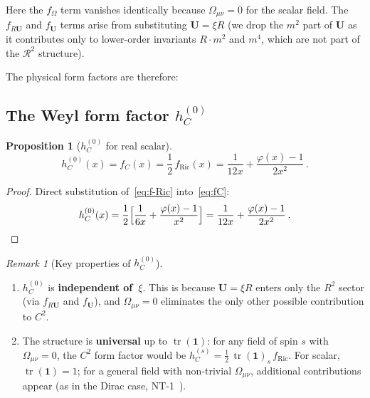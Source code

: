 \documentclass[11pt,a4paper]{article}
\newcommand{\Id}{\mathbf{1}}
\newcommand{\tr}{\operatorname{tr}}
\newtheorem{proposition}[theorem]{Proposition}
\theoremstyle{definition}
\theoremstyle{remark}
\newtheorem{remark}[theorem]{Remark}
\begin{document}
Here the $f_\Omega$ term vanishes identically
because $\Omega_{\mu\nu} = 0$ for the scalar field.
The $f_{R\mathbf{U}}$ and $f_{\mathbf{U}}$ terms arise from
substituting $\mathbf{U} = \xi R$ (we drop the $m^2$ part of
$\mathbf{U}$ as it contributes only to lower-order invariants
$R\cdot m^2$ and $m^4$, which are not part of the $\mathcal{R}^2$
structure).

The physical form factors are therefore:


\subsection{The Weyl form factor $h_C^{(0)}$}

\begin{proposition}[$h_C^{(0)}$ for real scalar]
\label{prop:hC}
\begin{equation}
  \boxed{
  h_C^{(0)}(x) = f_C(x) = \frac{1}{2}\,f_{\text{Ric}}(x)
  = \frac{1}{12x} + \frac{\varphi(x) - 1}{2x^2}\,.
  }
  \label{eq:hC}
\end{equation}
\end{proposition}

\begin{proof}
Direct substitution of~\eqref{eq:f-Ric} into~\eqref{eq:fC}:
\begin{equation*}
  h_C^{(0)}(x)
  = \frac{1}{2}\Bigl[\frac{1}{6x} + \frac{\varphi(x)-1}{x^2}\Bigr]
  = \frac{1}{12x} + \frac{\varphi(x)-1}{2x^2}\,.
\end{equation*}
\end{proof}

\begin{remark}[Key properties of $h_C^{(0)}$]
\label{rem:hC-properties}
\begin{enumerate}[nosep]
\item $h_C^{(0)}$ is \textbf{independent of~$\xi$}.  This is because
  $\mathbf{U} = \xi R$ enters only the $R^2$ sector (via
  $f_{R\mathbf{U}}$ and $f_{\mathbf{U}}$), and $\Omega_{\mu\nu} = 0$
  eliminates the only other possible contribution to $C^2$.
\item The structure is \textbf{universal} up to $\tr(\Id)$:
  for any field of spin $s$ with $\Omega_{\mu\nu} = 0$,
  the $C^2$ form factor would be
  $h_C^{(s)} = \frac{1}{2}\,\tr(\Id)_s\,f_{\text{Ric}}$.
  For scalar, $\tr(\Id) = 1$; for a general field with non-trivial
  $\Omega_{\mu\nu}$, additional contributions appear
  (as in the Dirac case, NT-1~\cite{NT1}).
\end{enumerate}
\end{remark}
\end{document}
